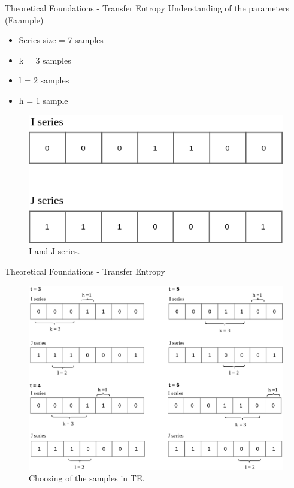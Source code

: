 \begin{frame}{Theoretical Foundations - Transfer Entropy}
Understanding of the parameters (Example)
    \begin{itemize}
        \item Series size = 7 samples
        \item k = 3 samples
        \item l = 2 samples
        \item h = 1 sample
        
    \end{itemize}
    
    \begin{figure}[!h]
        \centering
        \includegraphics[scale=0.4]{figuras/series.png}
        \caption{I and J series.}
        \label{fig:series}
    \end{figure}
\end{frame}

\begin{frame}{Theoretical Foundations - Transfer Entropy}

    \begin{figure}[!h]
        \centering
        \includegraphics[scale=0.2]{figuras/te_sim.png}
        \caption{Choosing of the samples in TE.}
        \label{fig:te_sim}
    \end{figure}
\end{frame}

